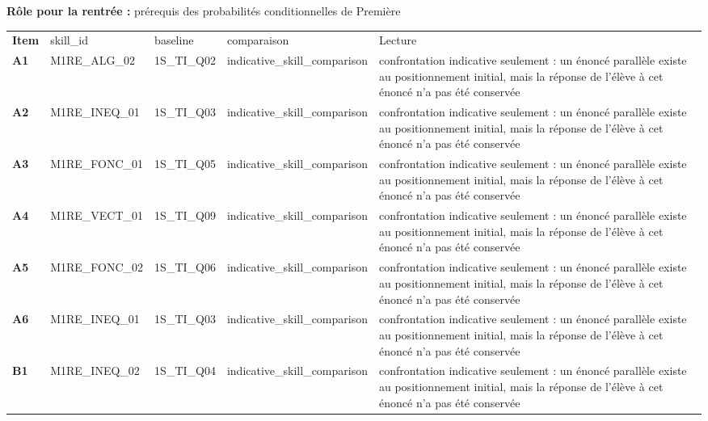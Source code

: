 \documentclass[10pt,a4paper]{article}
\begin{document}
\par\vspace{1mm}\small\textbf{Rôle pour la rentrée :} prérequis des probabilités conditionnelles de Première
\par\vspace{2mm}
\newpage{}
\par\noindent\begin{tabularx}{\linewidth}{>{\bfseries}p{9mm} >{\ttfamily\scriptsize}p{25mm} >{\ttfamily\scriptsize}p{22mm} >{\ttfamily\scriptsize}p{16mm} X}
\rowcolor{Navy}\color{white}Item & \color{white}\scriptsize skill\_id & \color{white}\scriptsize baseline & \color{white}\scriptsize comparaison & \color{white}Lecture \\
A1 & M1RE\_ALG\_02 & 1S\_TI\_Q02 & indicative\_skill\_comparison & confrontation indicative seulement : un énoncé parallèle existe au positionnement initial, mais la réponse de l'élève à cet énoncé n'a pas été conservée \\
A2 & M1RE\_INEQ\_01 & 1S\_TI\_Q03 & indicative\_skill\_comparison & confrontation indicative seulement : un énoncé parallèle existe au positionnement initial, mais la réponse de l'élève à cet énoncé n'a pas été conservée \\
A3 & M1RE\_FONC\_01 & 1S\_TI\_Q05 & indicative\_skill\_comparison & confrontation indicative seulement : un énoncé parallèle existe au positionnement initial, mais la réponse de l'élève à cet énoncé n'a pas été conservée \\
A4 & M1RE\_VECT\_01 & 1S\_TI\_Q09 & indicative\_skill\_comparison & confrontation indicative seulement : un énoncé parallèle existe au positionnement initial, mais la réponse de l'élève à cet énoncé n'a pas été conservée \\
A5 & M1RE\_FONC\_02 & 1S\_TI\_Q06 & indicative\_skill\_comparison & confrontation indicative seulement : un énoncé parallèle existe au positionnement initial, mais la réponse de l'élève à cet énoncé n'a pas été conservée \\
A6 & M1RE\_INEQ\_01 & 1S\_TI\_Q03 & indicative\_skill\_comparison & confrontation indicative seulement : un énoncé parallèle existe au positionnement initial, mais la réponse de l'élève à cet énoncé n'a pas été conservée \\
B1 & M1RE\_INEQ\_02 & 1S\_TI\_Q04 & indicative\_skill\_comparison & confrontation indicative seulement : un énoncé parallèle existe au positionnement initial, mais la réponse de l'élève à cet énoncé n'a pas été conservée \\

\end{tabularx}
\end{document}
